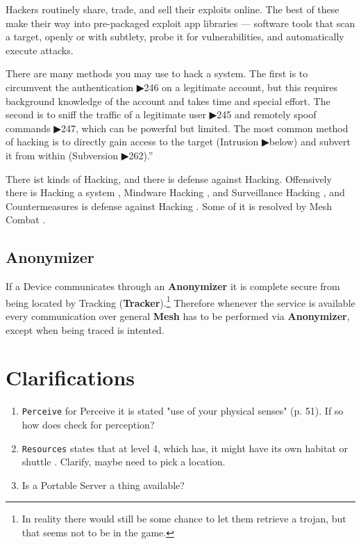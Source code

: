 Hackers routinely share, trade, and sell their exploits online. The best of these make their way into pre-packaged exploit app libraries — software tools that scan a target, openly or with subtlety, probe it for vulnerabilities, and automatically execute attacks. 

There are many methods you may use to hack a system. The first is to circumvent the authentication ▶246 on a legitimate account, but this requires background knowledge of the account and takes time and special effort. The second is to sniff the traffic of a legitimate user ▶245 and remotely spoof commands ▶247, which can be powerful but limited. The most common method of hacking is to directly gain access to the target (Intrusion ▶below) and subvert it from within (Subversion ▶262).” \citep[pg. 258]{ep2e_1.1_2019}

There ist kinds of Hacking, and there is defense against Hacking. Offensively there is Hacking a system \citep[pg. 258]{ep2e_1.1_2019}, Mindware Hacking \citep[pg. 266]{ep2e_1.1_2019}, and Surveillance Hacking \citep[pg. 270]{ep2e_1.1_2019}, and Countermeasures is defense against Hacking \citep[pg. 260]{ep2e_1.1_2019}. Some of it is resolved by Mesh Combat \citep[pg. 264]{ep2e_1.1_2019}.


\subsection{Anonymizer}

If a Device communicates through an \textbf{\gls{Anonymizer}} it is complete secure from being located by Tracking (\textbf{\gls{Tracker}}).\footnote{In reality there would still be some chance to let them retrieve a trojan, but that seems not to be in the game.} Therefore whenever the service is available every communication over general \textbf{\gls{Mesh}} has to be performed via \textbf{\gls{Anonymizer}}, except when being traced is intented.


\section{Clarifications}

\begin{enumerate}
    \item \texttt{Perceive}  for Perceive it is stated "use of your physical senses" (p. 51). If so how does \egr{} check for perception?

    \item \texttt{Resources} states that at level 4, which \egr{} has, it might have its own habitat or shuttle \citep[p. 75]{ep2e_1.1_2019}. Clarify, maybe need to pick a location.

    \item Is a Portable Server a thing available?
\end{enumerate}

